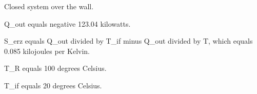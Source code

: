 Closed system over the wall.  

Q_out equals negative 123.04 kilowatts.  

S_erz equals Q_out divided by T_if minus Q_out divided by T, which equals 0.085 kilojoules per Kelvin.  

T_R equals 100 degrees Celsius.  

T_if equals 20 degrees Celsius.
